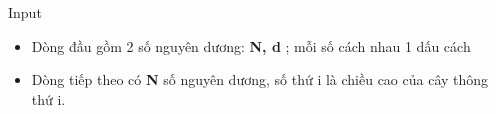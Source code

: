 Input
\begin{itemize}
	\item Dòng đầu gồm 2 số nguyên dương: \textbf{ N, d } ; mỗi số cách nhau 1 dấu cách
	\item Dòng tiếp theo có \textbf{ N } số nguyên dương, số thứ i là chiều cao của cây thông thứ i.
\end{itemize}